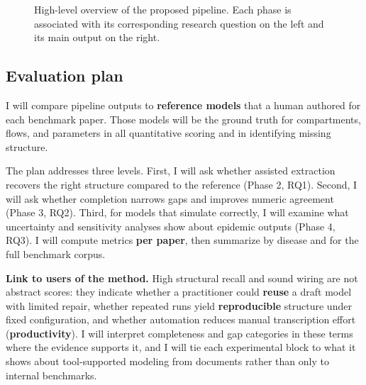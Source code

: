 \documentclass[a4paper,12pt]{article}
\begin{document}
\begin{figure}[t]
\caption{High-level overview of the proposed pipeline. Each phase is associated with its corresponding research question on the left and its main output on the right.}
\label{fig:pipeline_overview}
\end{figure}

\subsection{Evaluation plan}

I will compare pipeline outputs to \textbf{reference models} that a human authored for each benchmark paper. Those models will be the ground truth for compartments, flows, and parameters in all quantitative scoring and in identifying missing structure.

The plan addresses three levels. First, I will ask whether assisted extraction recovers the right structure compared to the reference (Phase 2, RQ1). Second, I will ask whether completion narrows gaps and improves numeric agreement (Phase 3, RQ2). Third, for models that simulate correctly, I will examine what uncertainty and sensitivity analyses show about epidemic outputs (Phase 4, RQ3). I will compute metrics \textbf{per paper}, then summarize by disease and for the full benchmark corpus.

\textbf{Link to users of the method.} High structural recall and sound wiring are not abstract scores: they indicate whether a practitioner could \textbf{reuse} a draft model with limited repair, whether repeated runs yield \textbf{reproducible} structure under fixed configuration, and whether automation reduces manual transcription effort (\textbf{productivity}). I will interpret completeness and gap categories in these terms where the evidence supports it, and I will tie each experimental block to what it shows about tool-supported modeling from documents rather than only to internal benchmarks.
\end{document}
